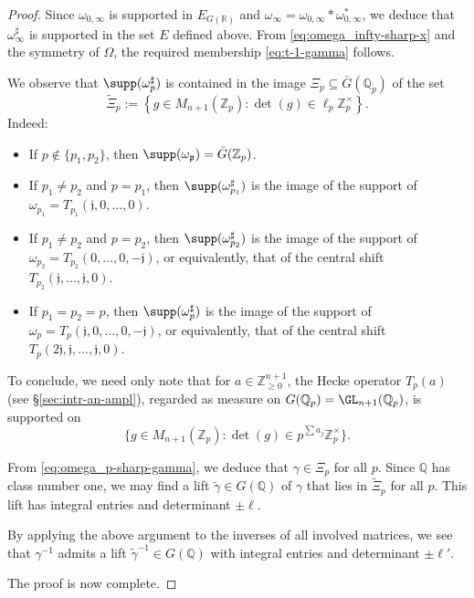 \begin{proof}
  Since $\omega_{0,\infty}$ is supported in $E_{G(\mathbb{R})}$ and $\omega_{\infty} = \omega_{0,\infty} \ast \omega_{0,\infty}^*$, we deduce that $\omega_\infty^\sharp$ is supported in the set $E$ defined above.  From \eqref{eq:omega_infty-sharp-x} and the symmetry of $\Omega$, the required membership \eqref{eq:t-1-gamma} follows.

  We observe that $\supp(\omega_{p}^\sharp)$ is contained in the image $\Xi_p \subseteq \bar{G}(\mathbb{Q}_p)$ of the set
  \begin{equation*}
    \tilde{\Xi}_p := \left\{ g \in M_{n+1}(\mathbb{Z}_p) : \det(g) \in \ell_p \mathbb{Z}_p^\times  \right\}.
  \end{equation*}
  Indeed:
  \begin{itemize}
  \item If $p \notin \{p_1, p_2\}$, then $\supp(\omega_{\mathfrak{p}}) = \bar{G}(\mathbb{Z}_p)$.
  \item If $p_1 \neq p_2$ and $p = p_1$, then $\supp(\omega_{p_1}^\sharp)$ is the image of the support of $\omega_{p_1} = T_{p_1}(\mathfrak{j},0,\dotsc,0)$.
  \item If $p_1 \neq p_2$ and $p = p_2$, then $\supp(\omega_{p_2}^\sharp)$ is the image of the support of $\omega_{p_2} = T_{p_2}(0,\dotsc,0,-\mathfrak{j})$, or equivalently, that of the central shift $T_{p_2}(\mathfrak{j},\dotsc,\mathfrak{j},0)$.
  \item If $p_1 = p_2 = p$, then $\supp(\omega_p^\sharp)$ is the image of the support of $\omega_p = T_p(\mathfrak{j},0,\dotsc,0,-\mathfrak{j})$, or equivalently, that of the central shift $T_p(2 \mathfrak{j}, \mathfrak{j}, \dotsc, \mathfrak{j}, 0)$.
  \end{itemize}
  To conclude, we need only note that for $a \in \mathbb{Z}_{\geq 0}^{n+1}$, the Hecke operator $T_p(a)$ (see \S\ref{sec:intr-an-ampl}), regarded as measure on $G(\mathbb{Q}_p) = \GL_{n+1}(\mathbb{Q}_p)$, is supported on
  \begin{equation*}
    \{g \in M_{n+1}(\mathbb{Z}_p) : \det(g) \in p^{\sum a_j} \mathbb{Z}_p^\times \}.
  \end{equation*}


  From \eqref{eq:omega_p-sharp-gamma}, we deduce that $\gamma \in \Xi_p$ for all $p$.  Since $\mathbb{Q}$ has class number one, we may find a lift $\tilde{\gamma} \in G(\mathbb{Q})$ of $\gamma$ that lies in $\tilde{\Xi}_p$ for all $p$.  This lift has integral entries and determinant $\pm \ell$.

  By applying the above argument to the inverses of all involved matrices, we see that $\gamma^{-1}$ admits a lift $\tilde{\gamma}^{-1} \in G(\mathbb{Q})$ with integral entries and determinant $\pm \ell '$.

  The proof is now complete.
\end{proof}

